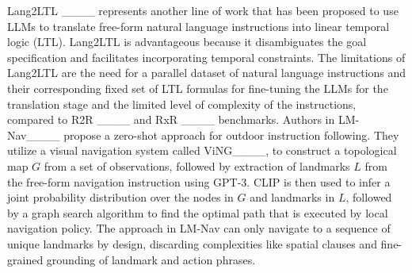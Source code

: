 \noindent Lang2LTL ____ represents another line of work that has been proposed to use LLMs to translate free-form natural language instructions into linear temporal logic (LTL). Lang2LTL is advantageous because it disambiguates the goal specification and facilitates incorporating temporal constraints. The limitations of Lang2LTL are the need for a parallel dataset of natural language instructions and their corresponding fixed set of LTL formulas for fine-tuning the LLMs for the translation stage and the limited level of complexity of the instructions, compared to R2R ____ and RxR ____ benchmarks. Authors in LM-Nav____ propose a zero-shot approach for outdoor instruction following. They utilize a visual navigation system called ViNG____, to construct a topological map $G$ from a set of observations, followed by extraction of landmarks $L$ from the free-form navigation instruction using GPT-3. 
CLIP is then used to infer a joint probability distribution over the nodes in $G$ and landmarks in $L$, followed by a graph search algorithm to find the optimal path that is executed by local navigation policy. The approach in LM-Nav can only navigate to a sequence of unique landmarks by design, discarding complexities like spatial clauses and fine-grained grounding
of landmark and action phrases. 

